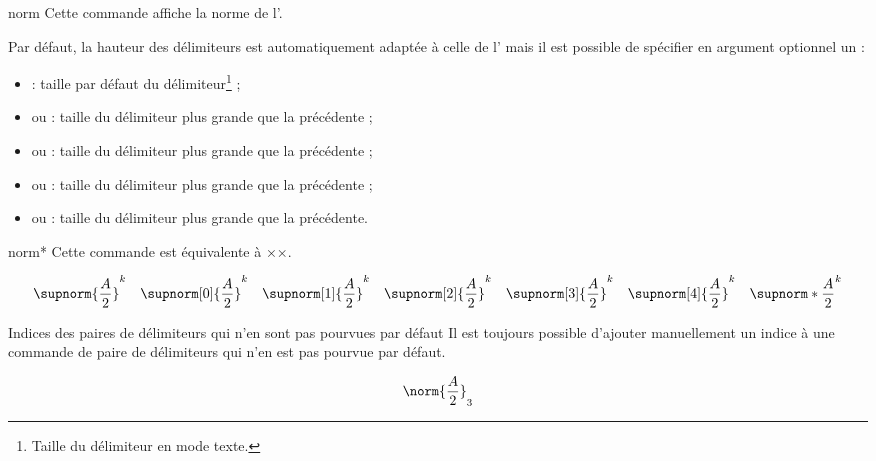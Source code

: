 \documentclass[french,nolocaltoc]{nwejmart}
\newtheorem[style=definition]{fait}
\newtheorem[title=contraventionnalisation]{ctrv}
\newtheorem[title-plural=anneaux]{anneau}
\newtheorem[title-plural=idéaux]{idéal}
\begin{document}
\begin{docCommand*}{norm}{}
  Cette commande affiche la norme de l'.

  Par défaut, la hauteur des délimiteurs est automatiquement adaptée à celle de
  l' mais il est possible de spécifier en argument optionnel un
   :
  \begin{itemize}
  \item {} : taille par défaut du délimiteur\footnote{Taille du
      délimiteur en mode texte.} ;
  \item {} ou  : taille du délimiteur plus grande
    que la précédente ;
  \item {} ou  : taille du délimiteur plus grande
    que la précédente ;
  \item {} ou  : taille du délimiteur plus grande
    que la précédente ;
  \item {} ou  : taille du délimiteur plus grande
    que la précédente.
  \end{itemize}
\end{docCommand*}

\begin{docCommand}{norm*}{}
  Cette commande est équivalente à ××.
\end{docCommand}

\begin{bodycode}
\begin{equation}
\supnorm{\frac{A}{2}}^k    \quad
\supnorm[0]{\frac{A}{2}}^k \quad
\supnorm[1]{\frac{A}{2}}^k \quad
\supnorm[2]{\frac{A}{2}}^k \quad
\supnorm[3]{\frac{A}{2}}^k \quad
\supnorm[4]{\frac{A}{2}}^k \quad
\supnorm*{\frac{A}{2}}^k
\end{equation}
\end{bodycode}

\begin{dbremark}{Indices des paires de délimiteurs qui n'en sont pas pourvues par défaut}{}
  Il est toujours possible d'ajouter manuellement un indice à une commande de
  paire de délimiteurs qui n'en est pas pourvue par défaut.
\begin{bodycode}
\begin{equation}
\norm{\frac{A}{2}}_3
\end{equation}
\end{bodycode}
\end{dbremark}
\end{document}
